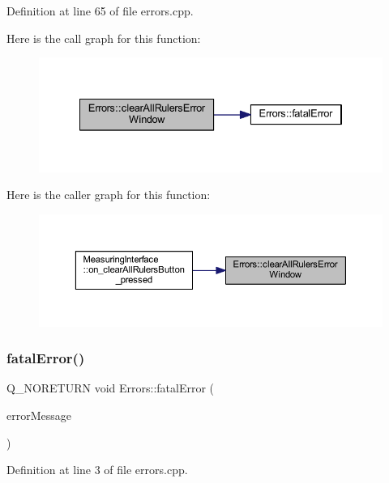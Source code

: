 Definition at line 65 of file errors.\+cpp.

Here is the call graph for this function\+:
\nopagebreak
\begin{figure}[H]
\begin{center}
\leavevmode
\includegraphics[width=334pt]{classErrors_a1aad6f02f491d241fafa37b86dbd0c1a_cgraph}
\end{center}
\end{figure}
Here is the caller graph for this function\+:
\nopagebreak
\begin{figure}[H]
\begin{center}
\leavevmode
\includegraphics[width=350pt]{classErrors_a1aad6f02f491d241fafa37b86dbd0c1a_icgraph}
\end{center}
\end{figure}
\mbox{\label{classErrors_afe4cb66263186b59444271e7ca44e025}} 
\subsubsection{\texorpdfstring{fatalError()}{fatalError()}}
{\footnotesize\ttfamily Q\+\_\+\+N\+O\+R\+E\+T\+U\+RN void Errors\+::fatal\+Error (\begin{DoxyParamCaption}\item[{Q\+String}]{error\+Message }\end{DoxyParamCaption})\hspace{0.3cm}{\ttfamily [static]}}



Definition at line 3 of file errors.\+cpp.

